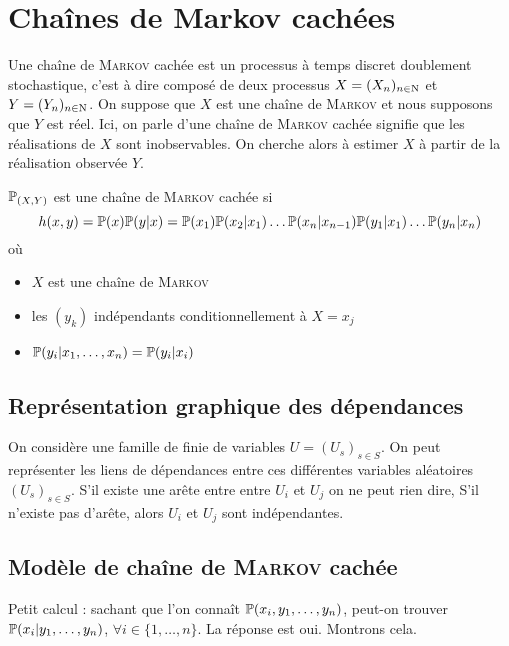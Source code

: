 \section{Chaînes de Markov cachées}

Une chaîne de \textsc{Markov} cachée est un processus à temps discret doublement stochastique, c'est à dire composé de deux processus $X = (X_n)_{n \in \N}$ et $Y = (Y_n)_{n \in \N}$. On suppose que $X$ est une chaîne de \textsc{Markov} et nous supposons que $Y$ est réel. Ici, on parle d'une chaîne de \textsc{Markov} \og cachée \fg{} signifie que les réalisations de $X$ sont inobservables. On cherche alors à estimer $X$ à partir de la réalisation observée $Y$.

\begin{definition}
  $\P_{(X,Y)}$ est une chaîne de \textsc{Markov} cachée si 
  \[ h(x,y) = \P(x)\P(y \vert x) = \P(x_1)\P(x_2 \vert x_1) \ldots \P(x_n \vert x_{n-1}) \P(y_1 \vert x_1) \ldots \P(y_n \vert x_n) \]
  où 
  \begin{itemize}
    \item $X$ est une chaîne de \textsc{Markov}
    \item les $(y_k)$ indépendants conditionnellement à $X = x_j$
    \item $\P(y_i \vert x_1,\ldots,x_n) = \P(y_i \vert x_i)$
  \end{itemize}
\end{definition}

\subsection{Représentation graphique des dépendances}

On considère une famille de finie de variables $U = (U_s)_{s \in S}$. On peut représenter les liens de dépendances entre ces différentes variables aléatoires $(U_s)_{s \in S}$. S'il existe une arête entre entre $U_i$ et $U_j$ on ne peut rien dire, S'il n'existe pas d'arête, alors $U_i$ et $U_j$ sont indépendantes.

\subsection{Modèle de chaîne de \textsc{Markov} cachée}

Petit calcul : sachant que l'on connaît $\P(x_i, y_1, \ldots, y_n)$, peut-on trouver $\P(x_i \vert y_1, \ldots, y_n)$, $\forall i\in \{1,\ldots,n\}$. La réponse est oui. Montrons cela.

